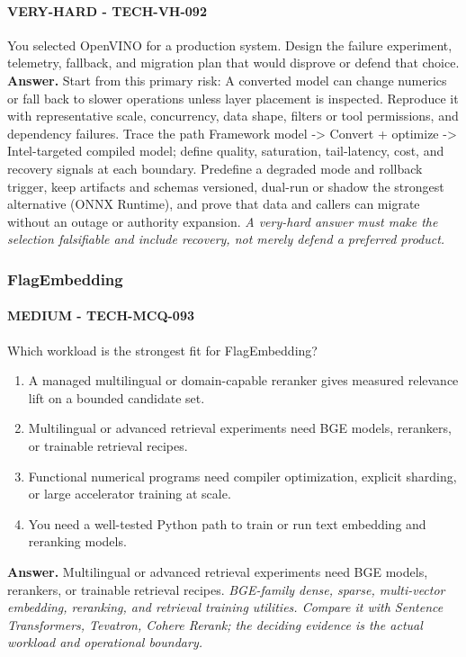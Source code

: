 \paragraph{VERY-HARD - TECH-VH-092} You selected OpenVINO for a production system. Design the failure experiment, telemetry, fallback, and migration plan that would disprove or defend that choice.
\textbf{Answer.} Start from this primary risk: A converted model can change numerics or fall back to slower operations unless layer placement is inspected. Reproduce it with representative scale, concurrency, data shape, filters or tool permissions, and dependency failures. Trace the path Framework model -> Convert + optimize -> Intel-targeted compiled model; define quality, saturation, tail-latency, cost, and recovery signals at each boundary. Predefine a degraded mode and rollback trigger, keep artifacts and schemas versioned, dual-run or shadow the strongest alternative (ONNX Runtime), and prove that data and callers can migrate without an outage or authority expansion.
\textit{A very-hard answer must make the selection falsifiable and include recovery, not merely defend a preferred product.}
\subsubsection*{FlagEmbedding}
\paragraph{MEDIUM - TECH-MCQ-093} Which workload is the strongest fit for FlagEmbedding?
\begin{enumerate}[label=\Alph*.]
\item A managed multilingual or domain-capable reranker gives measured relevance lift on a bounded candidate set.
\item Multilingual or advanced retrieval experiments need BGE models, rerankers, or trainable retrieval recipes.
\item Functional numerical programs need compiler optimization, explicit sharding, or large accelerator training at scale.
\item You need a well-tested Python path to train or run text embedding and reranking models.
\end{enumerate}
\textbf{Answer.} Multilingual or advanced retrieval experiments need BGE models, rerankers, or trainable retrieval recipes.
\textit{BGE-family dense, sparse, multi-vector embedding, reranking, and retrieval training utilities. Compare it with Sentence Transformers, Tevatron, Cohere Rerank; the deciding evidence is the actual workload and operational boundary.}
